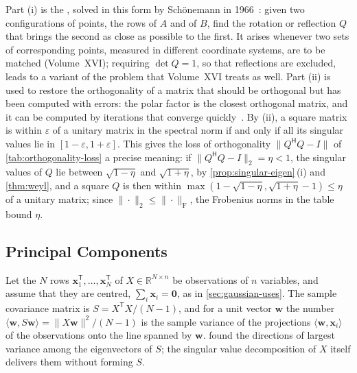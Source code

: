 Part (i) is the , solved in this form by Sch\"onemann in 1966~\cite{schonemann1966}: given two configurations of points, the rows of $A$ and of $B$, find the rotation or reflection $Q$ that brings the second as close as possible to the first. It arises whenever two sets of corresponding points, measured in different coordinate systems, are to be matched (Volume~XVI); requiring $\det Q=1$, so that reflections are excluded, leads to a variant of the problem that Volume~XVI treats as well. Part (ii) is used to restore the orthogonality of a matrix that should be orthogonal but has been computed with errors: the polar factor is the closest orthogonal matrix, and it can be computed by iterations that converge quickly~\cite{higham2008}. By (ii), a square matrix is within $\varepsilon$ of a unitary matrix in the spectral norm if and only if all its singular values lie in $[1-\varepsilon,1+\varepsilon]$. This gives the loss of orthogonality $\|Q^{\mathsf H}Q-I\|$ of \cref{tab:orthogonality-loss} a precise meaning: if $\|Q^{\mathsf H}Q-I\|_2=\eta<1$, the singular values of $Q$ lie between $\sqrt{1-\eta}$ and $\sqrt{1+\eta}$, by \cref{prop:singular-eigen}\,(i) and \cref{thm:weyl}, and a square $Q$ is then within $\max(1-\sqrt{1-\eta},\sqrt{1+\eta}-1)\le\eta$ of a unitary matrix; since $\|\cdot\|_2\le\|\cdot\|_{\mathrm F}$, the Frobenius norms in the table bound $\eta$.

\subsection{Principal Components}

Let the $N$ rows $\mathbf x_1^{\mathsf T},\ldots,\mathbf x_N^{\mathsf T}$ of $X\in\mathbb R^{N\times n}$ be observations of $n$ variables, and assume that they are centred, $\sum_i\mathbf x_i=\mathbf 0$, as in \cref{sec:gaussian-uses}. The sample covariance matrix is $S=X^{\mathsf T}X/(N-1)$, and for a unit vector $\mathbf w$ the number $\langle\mathbf w,S\mathbf w\rangle=\|X\mathbf w\|^2/(N-1)$ is the sample variance of the projections $\langle\mathbf w,\mathbf x_i\rangle$ of the observations onto the line spanned by $\mathbf w$.  found the directions of largest variance among the eigenvectors of $S$; the singular value decomposition of $X$ itself delivers them without forming $S$.

